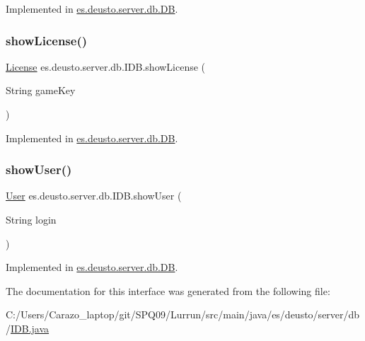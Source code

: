 Implemented in \hyperlink{classes_1_1deusto_1_1server_1_1db_1_1_d_b_ad3da93de99d7123529260d5dd966f178}{es.\+deusto.\+server.\+db.\+DB}.

\mbox{\label{interfacees_1_1deusto_1_1server_1_1db_1_1_i_d_b_ad408b5a93077c152ceba270caa34fd0a}} 
\subsubsection{\texorpdfstring{show\+License()}{showLicense()}}
{\footnotesize\ttfamily \hyperlink{classes_1_1deusto_1_1server_1_1db_1_1data_1_1_license}{License} es.\+deusto.\+server.\+db.\+I\+D\+B.\+show\+License (\begin{DoxyParamCaption}\item[{String}]{game\+Key }\end{DoxyParamCaption})}



Implemented in \hyperlink{classes_1_1deusto_1_1server_1_1db_1_1_d_b_add49bccfecff6217efd34b4656572ed6}{es.\+deusto.\+server.\+db.\+DB}.

\mbox{\label{interfacees_1_1deusto_1_1server_1_1db_1_1_i_d_b_aa2f6a5291fa8aa78d5a73b5878d17986}} 
\subsubsection{\texorpdfstring{show\+User()}{showUser()}}
{\footnotesize\ttfamily \hyperlink{classes_1_1deusto_1_1server_1_1db_1_1data_1_1_user}{User} es.\+deusto.\+server.\+db.\+I\+D\+B.\+show\+User (\begin{DoxyParamCaption}\item[{String}]{login }\end{DoxyParamCaption})}



Implemented in \hyperlink{classes_1_1deusto_1_1server_1_1db_1_1_d_b_ac85523faea523033439a932bbcab2c7e}{es.\+deusto.\+server.\+db.\+DB}.



The documentation for this interface was generated from the following file\+:\begin{DoxyCompactItemize}
\item 
C\+:/\+Users/\+Carazo\+\_\+laptop/git/\+S\+P\+Q09/\+Lurrun/src/main/java/es/deusto/server/db/\hyperlink{_i_d_b_8java}{I\+D\+B.\+java}\end{DoxyCompactItemize}
